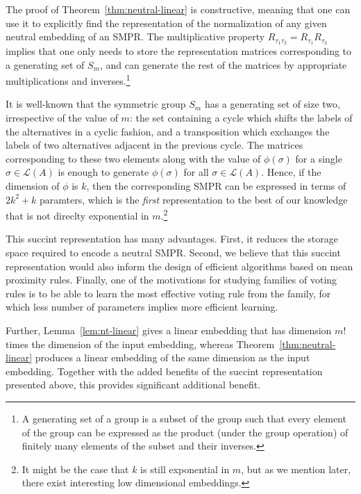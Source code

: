 \documentclass[prodmode,acmec]{ec-acmsmall}
\newcommand{\calL}{{\mathcal{L}}}
\newcommand{\rank}{{\calL(A)}}
\begin{document}
The proof of Theorem~\ref{thm:neutral-linear} is constructive, meaning that one can use it to explicitly find the representation of the normalization of any given neutral embedding of an SMPR. The multiplicative property $R_{\tau_1 \tau_2} = R_{\tau_1} R_{\tau_2}$ implies that one only needs to store the representation matrices corresponding to a generating set of $S_m$, and can generate the rest of the matrices by appropriate multiplications and inverses.\footnote{A generating set of a group is a subset of the group such that every element of the group can be expressed as the product (under the group operation) of finitely many elements of the subset and their inverses.} 

It is well-known that the symmetric group $S_m$ has a generating set of size two, irrespective of the value of $m$: the set containing a cycle which shifts the labels of the alternatives in a cyclic fashion, and a transposition which exchanges the labels of two alternatives adjacent in the previous cycle. The matrices corresponding to these two elements along with the value of $\phi(\sigma)$ for a single $\sigma \in \rank$ is enough to generate $\phi(\sigma)$ for all $\sigma \in \rank$. Hence, if the dimension of $\phi$ is $k$, then the corresponding SMPR can be expressed in terms of $2 k^2 + k$ paramters, which is the \emph{first} representation to the best of our knowledge that is not direclty exponential in $m$.\footnote{It might be the case that $k$ is still exponential in $m$, but as we mention later, there exist interesting low dimensional embeddings.} 

This succint representation has many advantages. First, it reduces the storage space required to encode a neutral SMPR. Second, we believe that this succint representation would also inform the design of efficient algorithms based on mean proximity rules. Finally, one of the motivations for studying families of voting rules is to be able to learn the most effective voting rule from the family, for which less number of parameters implies more efficient learning. 

Further, Lemma~\ref{lem:nt-linear} gives a linear embedding that has dimension $m!$ times the dimension of the input embedding, whereas Theorem~\ref{thm:neutral-linear} produces a linear embedding of the same dimension as the input embedding. Together with the added benefits of the succint representation presented above, this provides significant additional benefit. 
\end{document}
